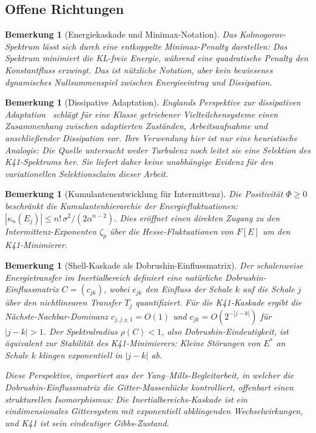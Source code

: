 \documentclass[12pt,a4paper]{article}
\theoremstyle{breakdef}
\theoremstyle{breakplain}
\theoremstyle{breakdef}
\newtheorem{remark}[definition]{Bemerkung}
\begin{document}
\subsection{Offene Richtungen}

\begin{remark}[Energiekaskade und Minimax-Notation]
Das Kolmogorov-Spektrum lässt sich durch eine entkoppelte
Minimax-Penalty darstellen: Das Spektrum minimiert die KL-freie Energie,
während eine quadratische Penalty den Konstantfluss erzwingt. Das ist
nützliche Notation, aber kein bewiesenes dynamisches Nullsummenspiel
zwischen Energieeintrag und Dissipation.
\end{remark}

\begin{remark}[Dissipative Adaptation]
Englands Perspektive zur dissipativen Adaptation~\cite{England2015}
schlägt für eine Klasse getriebener Vielteilchensysteme einen Zusammenhang
zwischen adaptierten Zuständen, Arbeitsaufnahme und anschließender Dissipation
vor. Ihre Verwendung hier ist nur eine heuristische Analogie: Die Quelle
untersucht weder Turbulenz noch leitet sie eine Selektion des K41-Spektrums
her. Sie liefert daher keine unabhängige Evidenz für den variationellen
Selektionsclaim dieser Arbeit.
\end{remark}

\begin{remark}[Kumulantenentwicklung für Intermittenz]
Die Positivität $\Phi \geq 0$ beschränkt die Kumulantenhierarchie der Energiefluktuationen: $|\kappa_n(E_j)| \leq n! \, \sigma^2 / (2\alpha^{n-2})$. Dies eröffnet einen direkten Zugang zu den Intermittenz-Exponenten $\zeta_p$ über die Hesse-Fluktuationen von $F[E]$ um den K41-Minimierer.
\end{remark}



\begin{remark}[Shell-Kaskade als Dobrushin-Einflussmatrix]
\label{rem:dobrushin-cascade}
Der schalenweise Energietransfer im Inertialbereich definiert eine
natürliche Dobrushin-Einflussmatrix $C = (c_{jk})$, wobei $c_{jk}$ den
Einfluss der Schale $k$ auf die Schale $j$ über den nichtlinearen
Transfer $T_j$ quantifiziert. Für die K41-Kaskade ergibt die
Nächste-Nachbar-Dominanz $c_{j,j\pm 1} = O(1)$ und
$c_{jk} = O(2^{-|j-k|})$ für $|j-k| > 1$. Der Spektralradius
$\rho(C) < 1$, also Dobrushin-Eindeutigkeit, ist äquivalent zur
Stabilität des K41-Minimierers: Kleine Störungen von $E^*$ an Schale
$k$ klingen exponentiell in $|j-k|$ ab.

Diese Perspektive, importiert aus der Yang--Mills-Begleitarbeit, in welcher
die Dobrushin-Einflussmatrix die Gitter-Massenlücke kontrolliert,
offenbart einen strukturellen Isomorphismus: Die
Inertialbereichs-Kaskade ist ein \glqq eindimensionales Gittersystem\grqq{} mit
exponentiell abklingenden Wechselwirkungen, und K41 ist sein eindeutiger
Gibbs-Zustand.
\end{remark}
\end{document}
